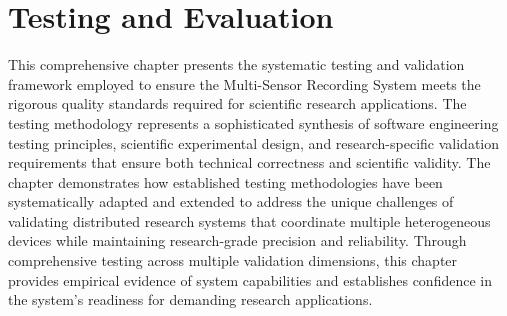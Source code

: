 \documentclass[11pt,a4paper]{report}
\begin{document}
\chapter{Testing and Evaluation}
This comprehensive chapter presents the systematic testing and validation framework employed to ensure the Multi-Sensor Recording System meets the rigorous quality standards required for scientific research applications. The testing methodology represents a sophisticated synthesis of software engineering testing principles, scientific experimental design, and research-specific validation requirements that ensure both technical correctness and scientific validity.
The chapter demonstrates how established testing methodologies have been systematically adapted and extended to address the unique challenges of validating distributed research systems that coordinate multiple heterogeneous devices while maintaining research-grade precision and reliability. Through comprehensive testing across multiple validation dimensions, this chapter provides empirical evidence of system capabilities and establishes confidence in the system’s readiness for demanding research applications.
\end{document}
